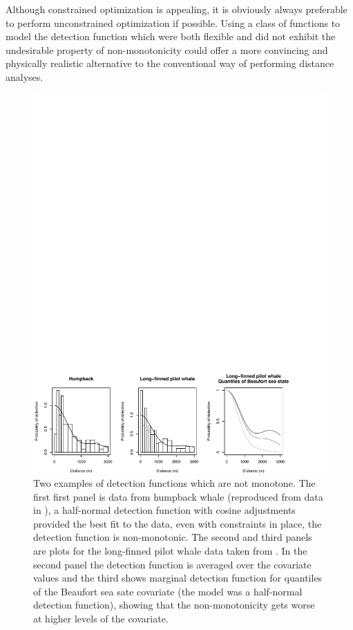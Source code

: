 Although constrained optimization is appealing, it is obviously always preferable to perform unconstrained optimization if possible. Using a class of functions to model the detection function which were both flexible and did not exhibit the undesirable property of non-monotonicity could offer a more  convincing and physically realistic alternative to the conventional way of performing distance analyses.

\begin{figure}
\centering
\includegraphics[width=\textwidth]{mix/figs/figure1.pdf}
\caption{Two examples of detection functions which are not monotone. The first first panel is data from humpback whale (reproduced from data in ), a half-normal detection function with cosine adjustments provided the best fit to the data, even with constraints in place, the detection function is non-monotonic. The second and third panels are plots for the long-finned pilot whale data taken from \cite{pike}. In the second panel the detection function is averaged over the covariate values and the third shows marginal detection function for quantiles of the Beaufort sea sate covariate (the model was a half-normal detection function), showing that the non-monotonicity gets worse at higher levels of the covariate.}
\label{fig1}
\end{figure}

